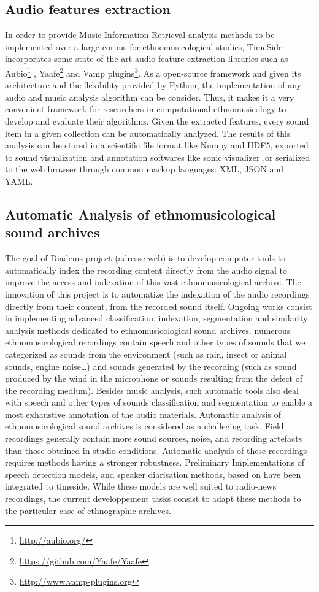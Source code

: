 \documentclass{sig-alternate}
\begin{document}
\subsection{Audio features extraction}
In order to provide Music Information Retrieval analysis methods to be implemented over a large corpus for ethnomusicological studies, TimeSide incorporates some state-of-the-art audio feature extraction libraries such as Aubio\footnote{\url{http://aubio.org/}} \cite{brossierPhD}, Yaafe\footnote{\url{https://github.com/Yaafe/Yaafe}} \cite{yaafe_ISMIR2010} and Vamp plugins\footnote{ \url{http://www.vamp-plugins.org}}.
As a open-source framework and given its architecture and the flexibility provided by Python, the implementation of any audio and music analysis algorithm can be consider. Thus, it makes it a very convenient framework for researchers in computational ethnomusicology to develop and evaluate their algorithms.
Given the extracted features, every sound item in a given collection can be automatically analyzed. The results of this analysis can be stored in a scientific file format like Numpy and HDF5, exported to sound visualization and annotation softwares like sonic visualizer \cite{cannam2006sonic},or serialized to the web browser through common markup languages: XML, JSON and YAML.

\subsection{Automatic Analysis of ethnomusicological sound archives}
The goal of Diadems project (adresse web) is to develop computer tools to automatically index the recording content directly from the audio signal to improve the access and indexation of this vast ethnomusicological archive. The innovation of this project is to automatize the indexation of the audio recordings directly from their content, from the recorded sound itself.
Ongoing works consist in implementing advanced classification, indexation, segmentation and similarity analysis methods dedicated to ethnomusicological sound archives.
numerous ethnomusicological recordings contain speech and other types of sounds that we categorized as sounds from the environment (such as rain, insect or animal sounds, engine noise…) and sounds generated by the recording (such as sound produced by the wind in the microphone or sounds resulting from the defect of the recording medium).
Besides music analysis, such automatic tools also deal with speech and other types of sounds classification and segmentation to enable a most exhaustive annotation of the audio materials.
Automatic analysis of ethnomusicological sound archives is considered as a challeging task.
Field recordings generally contain more sound sources, noise, and recording artefacts than those obtained in studio conditions.
Automatic analysis of these recordings requires methods having a stronger robustness.
Preliminary Implementations  of speech detection models, and speaker diarisation methods, based on  \cite{barras2006multistage} have been integrated to timeside. 
While these models are well suited to radio-news recordings, the current developpement tasks consist to adapt these methods to the particular case of ethnographic archives.
\end{document}
